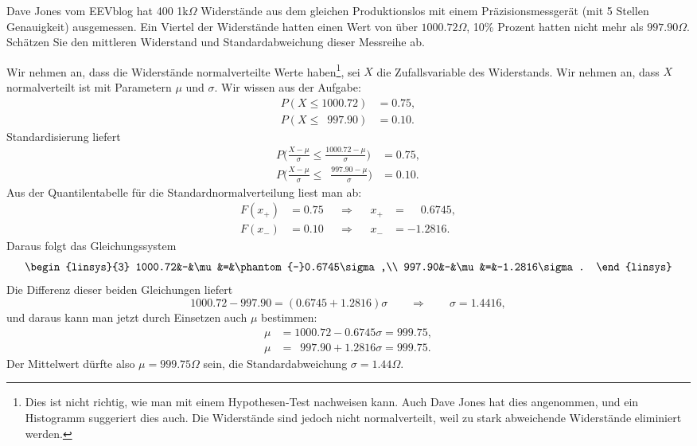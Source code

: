 Dave Jones vom EEVblog hat 400 1k$\Omega$ Widerstände aus dem gleichen
Produktionslos mit einem Präzisionsmessgerät (mit 5 Stellen
Genauigkeit) ausgemessen. 
Ein Viertel der Widerstände hatten einen Wert von über $1000.72\Omega$,
10\% Prozent hatten nicht mehr als $997.90\Omega$.
Schätzen Sie den mittleren Widerstand und Standardabweichung dieser
Messreihe ab.


\begin{loesung}
Wir nehmen an, dass die Widerstände normalverteilte Werte haben\footnote{
Dies ist nicht richtig, wie man mit einem Hypothesen-Test nachweisen kann.
Auch Dave Jones hat dies angenommen, und ein Histogramm suggeriert
dies auch. Die Widerstände sind jedoch nicht normalverteilt, weil zu
stark abweichende Widerstände eliminiert werden.}, sei $X$ die Zufallsvariable
des Widerstands.
Wir nehmen an, dass $X$ normalverteilt ist mit Parametern $\mu$ und $\sigma$.
Wir wissen aus der Aufgabe:
\begin{equation}
\begin{aligned}
P(X\le 1000.72)&=0.75,
\\
P(X\le \phantom{0}997.90)&=0.10.
\end{aligned}
\label{60000042:prob}
\end{equation}
Standardisierung liefert
\begin{equation*}
\begin{aligned}
P\biggl(\frac{X-\mu}{\sigma}\le \frac{1000.72-\mu}{\sigma}\biggr)&=0.75,
\\
P\biggl(\frac{X-\mu}{\sigma}\le \phantom{0}\frac{997.90-\mu}{\sigma}\biggr)&=0.10.
\end{aligned}
\end{equation*}
Aus der Quantilentabelle für die Standardnormalverteilung liest man ab:
\[
\begin{aligned}
F(x_+)&=0.75&&\Rightarrow&&x_+&=\phantom{-}0.6745,\\
F(x_-)&=0.10&&\Rightarrow&&x_-&=-1.2816.
\end{aligned}
\]
Daraus folgt das Gleichungssystem
\[
\begin{linsys}{3}
1000.72&-&\mu&=&\phantom{-}0.6745\sigma,\\
 997.90&-&\mu&=&-1.2816\sigma.
\end{linsys}
\]
Die Differenz dieser beiden Gleichungen liefert
\[
1000.72-997.90 = (0.6745 + 1.2816)\sigma
\qquad
\Rightarrow
\qquad
\sigma = 1.4416,
\]
und daraus kann man jetzt durch Einsetzen auch $\mu$ bestimmen:
\begin{align*}
\mu&=1000.72-0.6745\sigma=999.75,\\
\mu&=\phantom{0}997.90+1.2816\sigma=999.75.
\end{align*}
Der Mittelwert dürfte also $\mu=999.75\Omega$ sein, die Standardabweichung
$\sigma=1.44\Omega$.
\end{loesung}

